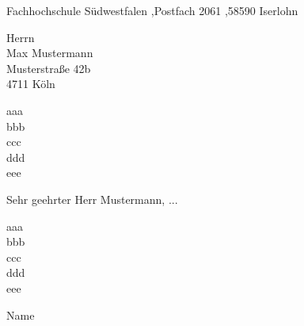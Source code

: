 \documentclass[a4paper, 10pt, parskip=off, headheight=25mm, footheight=25mm]{scrartcl}
\newcommand{\name}{{{Name}}}
\newcommand{\postfach}{Fachhochschule Südwestfalen \sep Postfach 2061 \sep 58590 Iserlohn}
\begin{document}
\daten %
\begin{addmargin}[0mm]{\randbreite}

\begin{absender}
\postfach
\end{absender}

\begin{empfaenger}
{{Herrn \\ Max Mustermann \\ Musterstraße 42b \\ 4711 Köln }}
\end{empfaenger}

\begin{betreff}
{{aaa\\bbb\\ ccc \\ddd \\ eee}}
\end{betreff}

\begin{text}
{{Sehr geehrter Herr Mustermann, ... }}
\end{text}

{{aaa\\bbb\\ ccc \\ddd \\ eee }}

\vspace{15mm}
\name

\end{addmargin}
\end{document}
